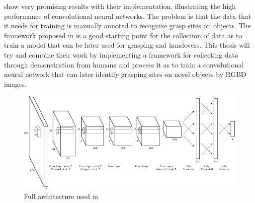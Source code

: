 \textcite{Redmon2014} show very promising results with their implementation, illustrating the high performance of convolutional neural networks. The problem is that the data that it needs for training is manually annoted to recognize grasp sites on objects. The framework proposed in \parencite{Chan2015a} is a good starting point for the collection of data as to train a model that can be later used for grasping and handovers. This thesis will try and combine their work by implementing a framework for collecting data through demonstration from humans and process it as to train a convolutional neural network that can later identify grasping sites on novel objects by RGBD images.

\begin{figure}
	\centering
	\includegraphics[width=\textwidth]{img/related-work/cnn-architecture.png}
	\caption{Full architecture used in \parencite{Redmon2014}}
\end{figure}

